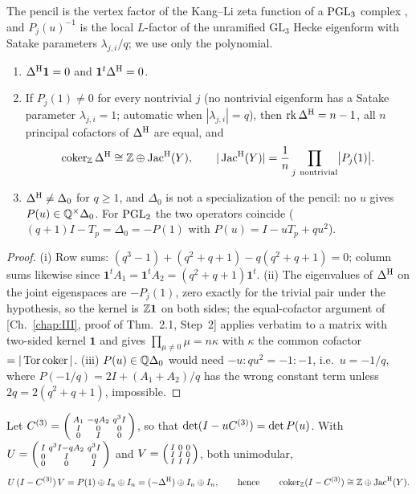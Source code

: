The pencil is the vertex factor of the Kang--Li zeta function of a $\mathrm{PGL}_3$ complex
\cite{KL}, and $P_j(u)^{-1}$ is the local $L$-factor of the unramified $\mathrm{GL}_3$
Hecke eigenform with Satake parameters $\lambda_{j,i}/q$; we use only the polynomial.

\begin{theorem}\label{X:thm:hecke}
\begin{enumerate}
\item[(i)] $\Delta^{\mathrm{H}}\mathbf1=0$ and $\mathbf1^{t}\Delta^{\mathrm{H}}=0$.
\item[(ii)] If $P_j(1)\neq0$ for every nontrivial $j$ (no nontrivial eigenform has a
Satake parameter $\lambda_{j,i}=1$; automatic when $|\lambda_{j,i}|=q$), then
$\operatorname{rk}\Delta^{\mathrm{H}}=n-1$, all $n$ principal cofactors of $\Delta^{\mathrm{H}}$ are equal, and
\[
\operatorname{coker}_{\mathbb{Z}}\Delta^{\mathrm{H}}\cong\mathbb{Z}\oplus\operatorname{Jac}^{\mathrm{H}}(Y),\qquad
|\operatorname{Jac}^{\mathrm{H}}(Y)|=\frac1n\prod_{j\ \mathrm{nontrivial}}\bigl|P_j(1)\bigr| .
\]
\item[(iii)] $\Delta^{\mathrm{H}}\neq\Delta_0$ for $q\ge1$, and $\Delta_0$ is not a specialization of the
pencil: no $u$ gives $P(u)\in\mathbb{Q}^{\times}\Delta_0$. For $\mathrm{PGL}_2$ the two operators coincide
($(q{+}1)I-T_p=\Delta_0=-P(1)$ with $P(u)=I-uT_p+qu^{2}$).
\end{enumerate}
\end{theorem}

\begin{proof}
(i) Row sums: $(q^{3}-1)+(q^{2}+q+1)-q(q^{2}+q+1)=0$; column sums likewise since
$\mathbf1^{t}A_1=\mathbf1^{t}A_2=(q^{2}+q+1)\mathbf1^{t}$. (ii) The eigenvalues of $\Delta^{\mathrm{H}}$
on the joint eigenspaces are $-P_j(1)$, zero exactly for the trivial pair under the
hypothesis, so the kernel is $\mathbb{Z}\mathbf1$ on both sides; the equal-cofactor argument of
[Ch.~\ref{chap:III}, proof of Thm.~2.1, Step~2] applies verbatim to a matrix with two-sided kernel
$\mathbf1$ and gives $\prod_{\mu\neq0}\mu=n\kappa$ with $\kappa$ the common cofactor
$=|\operatorname{Tor}\operatorname{coker}|$. (iii) $P(u)\in\mathbb{Q}\Delta_0$ would need $-u:qu^{2}=-1:-1$, i.e.\ $u=-1/q$,
where $P(-1/q)=2I+(A_1+A_2)/q$ has the wrong constant term unless $2q=2(q^{2}+q+1)$,
impossible.
\end{proof}

\begin{theorem}\label{X:thm:companion}
Let $C^{(3)}=\begin{psmallmatrix}A_1&-qA_2&q^{3}I\\ I&0&0\\0&I&0\end{psmallmatrix}$, so
that $\det(I-uC^{(3)})=\det P(u)$. With
$U=\begin{psmallmatrix}I&q^{3}I-qA_2&q^{3}I\\0&I&0\\0&0&I\end{psmallmatrix}$ and
$V=\begin{psmallmatrix}I&0&0\\ I&I&0\\ I&I&I\end{psmallmatrix}$, both unimodular,
\[
U\,(I-C^{(3)})\,V=P(1)\oplus I_n\oplus I_n=(-\Delta^{\mathrm{H}})\oplus I_n\oplus I_n,
\qquad\text{hence}\qquad \operatorname{coker}_{\mathbb{Z}}(I-C^{(3)})\cong\mathbb{Z}\oplus\operatorname{Jac}^{\mathrm{H}}(Y).
\]
\end{theorem}

